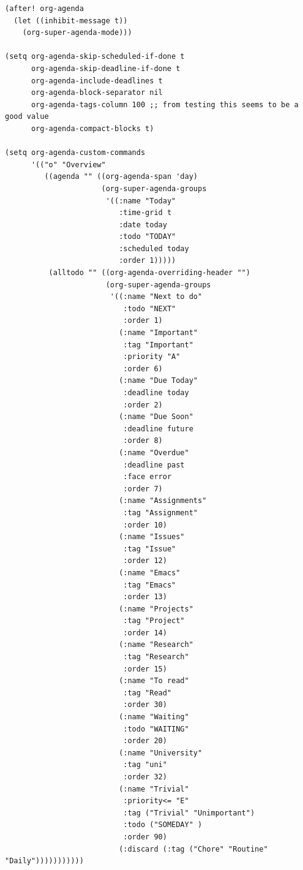 \documentclass[11pt]{article}
\begin{document}
\begin{verbatim}
(after! org-agenda
  (let ((inhibit-message t))
    (org-super-agenda-mode)))

(setq org-agenda-skip-scheduled-if-done t
      org-agenda-skip-deadline-if-done t
      org-agenda-include-deadlines t
      org-agenda-block-separator nil
      org-agenda-tags-column 100 ;; from testing this seems to be a good value
      org-agenda-compact-blocks t)

(setq org-agenda-custom-commands
      '(("o" "Overview"
         ((agenda "" ((org-agenda-span 'day)
                      (org-super-agenda-groups
                       '((:name "Today"
                          :time-grid t
                          :date today
                          :todo "TODAY"
                          :scheduled today
                          :order 1)))))
          (alltodo "" ((org-agenda-overriding-header "")
                       (org-super-agenda-groups
                        '((:name "Next to do"
                           :todo "NEXT"
                           :order 1)
                          (:name "Important"
                           :tag "Important"
                           :priority "A"
                           :order 6)
                          (:name "Due Today"
                           :deadline today
                           :order 2)
                          (:name "Due Soon"
                           :deadline future
                           :order 8)
                          (:name "Overdue"
                           :deadline past
                           :face error
                           :order 7)
                          (:name "Assignments"
                           :tag "Assignment"
                           :order 10)
                          (:name "Issues"
                           :tag "Issue"
                           :order 12)
                          (:name "Emacs"
                           :tag "Emacs"
                           :order 13)
                          (:name "Projects"
                           :tag "Project"
                           :order 14)
                          (:name "Research"
                           :tag "Research"
                           :order 15)
                          (:name "To read"
                           :tag "Read"
                           :order 30)
                          (:name "Waiting"
                           :todo "WAITING"
                           :order 20)
                          (:name "University"
                           :tag "uni"
                           :order 32)
                          (:name "Trivial"
                           :priority<= "E"
                           :tag ("Trivial" "Unimportant")
                           :todo ("SOMEDAY" )
                           :order 90)
                          (:discard (:tag ("Chore" "Routine" "Daily")))))))))))
\end{verbatim}
\end{document}
